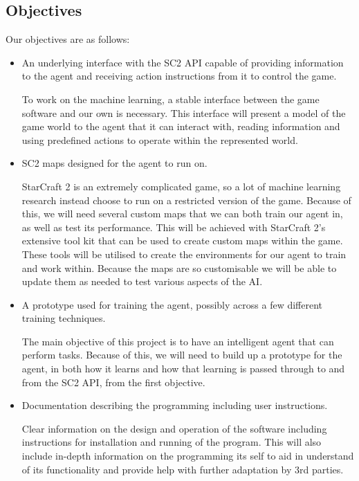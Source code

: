 \documentclass[12pt]{article}
\begin{document}
\subsection{Objectives}
Our objectives are as follows:
\begin{itemize}
    \item An underlying interface with the SC2 API capable of providing
          information to the agent and receiving action instructions
          from it to control the game.

          To work on the machine learning, a stable interface between the
          game software and our own is necessary. This interface will present
          a model of the game world to the agent that it can interact with,
          reading information and using predefined actions to
          operate within the represented world.
    \item SC2 maps designed for the agent to run on.

          StarCraft 2 is an extremely complicated game,
          so a lot of machine learning research instead choose to run
          on a restricted version of the game. Because of this,
          we will need several custom maps that we can both train our
          agent in, as well as test its performance. This will be
          achieved with StarCraft 2’s extensive tool kit that can
          be used to create custom maps within the game.
          These tools will be utilised to create the environments for
          our agent to train and work within. Because the maps are
          so customisable we will be able to update them as needed to
          test various aspects of the AI.

    \item A prototype used for training the agent, possibly across a few
          different training techniques.

          The main objective of this project is to have an intelligent
          agent that can perform tasks. Because of this, we will need to build
          up a prototype for the agent, in both how it learns and how that
          learning is passed through to and from the SC2 API, from the
          first objective.

    \item Documentation describing the programming including user instructions.

          Clear information on the design and operation of the software including
          instructions for installation and running of the program.
          This will also include in-depth information on the programming its
          self to aid in understand of its functionality and provide help with
          further adaptation by 3rd parties.


\end{itemize}
\end{document}
